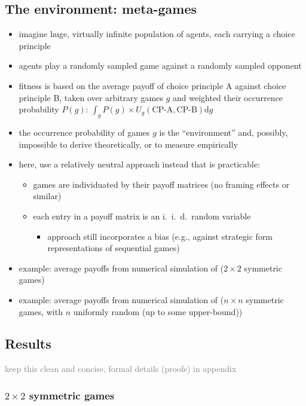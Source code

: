 \documentclass[fleqn,reqno,11pt]{article}
\begin{document}
\subsection{The environment: meta-games}

\begin{itemize}
\item imagine huge, virtually infinite population of agents, each carrying a choice principle
\item agents play a randomly sampled game against a randomly sampled opponent
\item fitness is based on the average payoff of choice principle A against choice principle B,
  taken over arbitrary games $g$ and weighted their occurrence probability $P(g)$:
  $\int_g P(g) \times U_g(\text{CP-A}, \text{CP-B}) \text{d}g$
\item the occurrence probability of games $g$ is the ``environment'' and, possibly, impossible to
  derive theoretically, or to measure empirically
\item here, use a relatively neutral approach instead that is practicable:
  \begin{itemize}
  \item games are individuated by their payoff matrices (no framing effects or similar)
  \item each entry in a payoff matrix is an i.~i.~d.~random variable
    \begin{itemize}
    \item approach still incorporates a bias (e.g., against strategic form representations of
      sequential games)
    \end{itemize}
  \end{itemize}
\item example: average payoffs from numerical simulation of ($2 \times 2$ symmetric games)
\item example: average payoffs from numerical simulation of ($n \times n$ symmetric games, with
  $n$ uniformly random (up to some upper-bound))
\end{itemize}

\subsection{Results}

\textcolor{gray}{keep this clean and concise, formal details (proofs) in appendix}

\subsubsection{$2 \times 2$ symmetric games}
\end{document}
